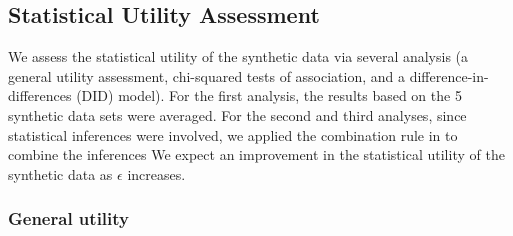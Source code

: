 \documentclass[12pt, A4]{article}
\theoremstyle{plain}
\theoremstyle{exampstyle}\newtheorem{defn}{Definition}
\theoremstyle{exampstyle}\newtheorem{lem}{Lemma}
\theoremstyle{exampstyle}\newtheorem{cor}{Corollary}
\theoremstyle{exampstyle}\newtheorem{pro}{Proposition}
\theoremstyle{exampstyle}\newtheorem{cla}{Claim}
\theoremstyle{exampstyle}\newtheorem{rem}{Remark}
\begin{document}
\subsection{Statistical Utility Assessment}\label{sec:results}
We assess the statistical utility of the synthetic data via several analysis (a general utility assessment, chi-squared tests of association, and a difference-in-differences (DID) model). For the first analysis, the results based on the 5 synthetic data sets were averaged. For the second and third analyses, since statistical inferences were involved, we applied the combination rule in \citet{liu2016model} to combine the inferences We expect an improvement in the statistical utility of the synthetic data as $\epsilon$ increases. 

\subsubsection{General utility}\label{sec:specks}
\end{document}
